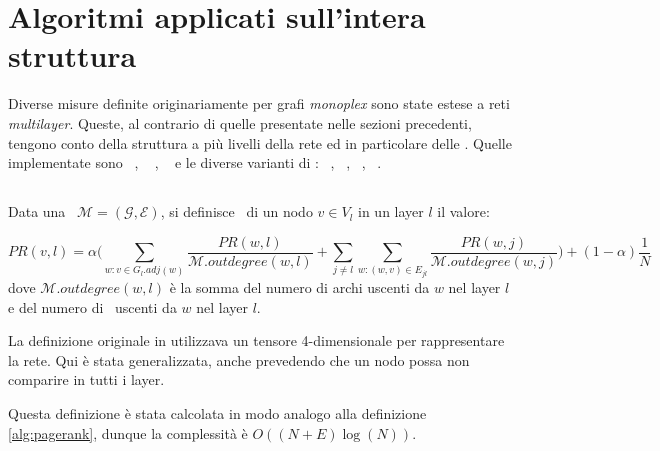 \section{Algoritmi applicati sull'intera struttura}
Diverse misure definite originariamente per grafi \textit{monoplex} sono state estese a 
reti \textit{multilayer}. Queste, al contrario di quelle presentate nelle sezioni precedenti,
tengono conto della struttura a più livelli della rete ed in particolare delle \interc.
Quelle implementate sono 
\verPageRank~\cite{dedomenico:versatile},
\verBetweennessCentrality~\cite{dedomenico:versatile} \cite{dedomenico:verbetw},
\multiCore~\cite{azimi:multikcore} e le diverse varianti di \PCI: 
\mlPCI~\cite{basaras:infspmul},
\laPCI~\cite{basaras:infspmul},
\alPCI~\cite{basaras:infspmul},
\lsPCI~\cite{basaras:infspmul}.

\subsection{\verPageRank}
\begin{definizione}[\verPageRank]
    Data una \muln\ $\mathcal{M}=(\mathcal{G}, \mathcal{E})$,
    si definisce \verPageRank\ di un nodo $v \in V_l$ in un layer $l$
    il valore:

    \begin{equation}
        PR(v, l) = 
        \alpha \biggl( 
            \sum_{w : v \in G_l.adj(w)} \frac{PR(w, l)}{\mathcal{M}.outdegree(w, l)} +
            \sum_{j \neq l}^{}\sum_{w : (w, v) \in E_{jl}} \frac{PR(w, j)}{\mathcal{M}.outdegree(w, j)} 
        \biggr) + (1-\alpha)\frac{1}{N}
    \end{equation}
    dove $\mathcal{M}.outdegree(w, l)$ è la somma del numero di archi uscenti da $w$ nel layer $l$
    e del numero di \interc\ uscenti da $w$ nel layer $l$.

\end{definizione}

La definizione originale in \cite{dedomenico:versatile} utilizzava un tensore 4-dimensionale per 
rappresentare la rete. Qui è stata generalizzata, anche prevedendo che un nodo possa non comparire 
in tutti i layer.

Questa definizione è stata calcolata in modo analogo alla definizione \vref{alg:pagerank},
dunque la complessità è $O((N + E)\log(N))$.

\subsection{\verBetweennessCentrality}


